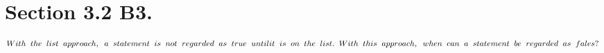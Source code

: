 \section*{Section 3.2 B3. $With \;\; the \;\; list \;\; approach, \;\; a \;\; statement \;\; is \;\; not \;\; regarded \;\; as \;\; true \;\; until \\ it \;\; is \;\; on \;\; the \;\; list. \;\; With \;\; this \;\; approach, \;\; when \;\; can \;\; a \;\; statement \;\; be \;\; regarded \;\; as \;\; fales?$}

